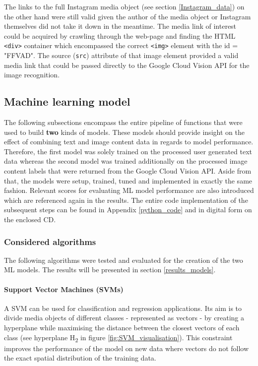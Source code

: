 The links to the full Instagram media object (see section \ref{Instagram_data}) on the other hand were still valid given the author of the media object or Instagram themselves did not take it down in the meantime. The media link of interest could be acquired by crawling through the web-page and finding the HTML \texttt{<div>} container which encompassed the correct \texttt{<img>} element with the id = "FFVAD". The source (\texttt{src}) attribute of that image element provided a valid media link that could be passed directly to the Google Cloud Vision API for the image recognition.

\subsection{Machine learning model} \label{ml_model}
The following subsections encompass the entire pipeline of functions that were used to build \textbf{two} kinds of models. These models should provide insight on the effect of combining text and image content data in regards to model performance. Therefore, the first model was solely trained on the processed user generated text data whereas the second model was trained additionally on the processed image content labels that were returned from the Google Cloud Vision API. Aside from that, the models were setup, trained, tuned and implemented in exactly the same fashion. Relevant scores for evaluating ML model performance are also introduced which are referenced again in the results. The entire code implementation of the subsequent steps can be found in Appendix \ref{python_code} and in digital form on the enclosed CD.

\clearpage

\subsubsection{Considered algorithms} \label{ml_algorithms}
The following algorithms were tested and evaluated for the creation of the two ML models. The results will be presented in section \ref{results_models}.

\paragraph*{Support Vector Machines (SVMs)}
A SVM can be used for classification and regression applications. Its aim is to divide media objects of different classes - represented as vectors - by creating a hyperplane while maximising the distance between the closest vectors of each class (see hyperplane H\textsubscript{2} in figure \ref{fig:SVM_visualisation}). This constraint improves the performance of the model on new data where vectors do not follow the exact spatial distribution of the training data.

